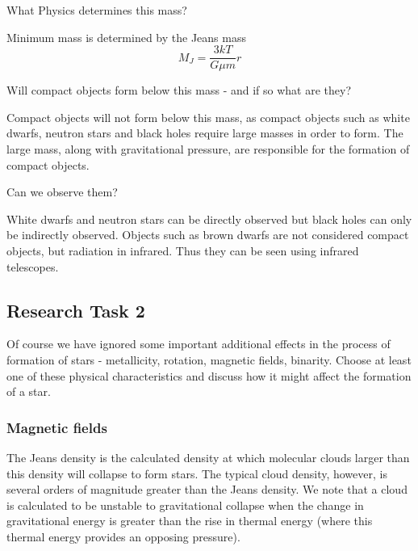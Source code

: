 \documentclass[a4paper]{article} %
\begin{document}
\begin{framed}
What Physics determines this mass?
\end{framed}

Minimum mass is determined by the Jeans mass
\begin{equation*}
M_J=\frac{3kT}{G\mu m}r
\end{equation*}


\begin{framed}
Will compact objects form below this mass - and if so what are they?
\end{framed}

Compact objects will not form below this mass, as compact objects such as white dwarfs, neutron stars and black holes require large masses in order to form. The large mass, along with gravitational pressure, are responsible for the formation of compact objects.

\begin{framed}
Can we observe them?
\end{framed}
White dwarfs and neutron stars can be directly observed but black holes can only be indirectly observed. Objects such as brown dwarfs are not considered compact objects, but radiation in infrared. Thus they can be seen using infrared telescopes.

\pagebreak

\subsection{Research Task 2}
\begin{framed}
Of course we have ignored some important additional effects in the process of formation of stars - metallicity, rotation, magnetic fields, binarity. Choose at least one of these physical characteristics and discuss how it might affect the formation of a star.
\end{framed}

\subsubsection{Magnetic fields}

The Jeans density is the calculated density at which molecular clouds larger than this density will collapse to form stars. The typical cloud density, however, is several orders of magnitude greater than the Jeans density. We note that a cloud is calculated to be unstable to gravitational collapse when the change in gravitational energy is greater than the rise in thermal energy (where this thermal energy provides an opposing pressure). 
\end{document}
